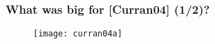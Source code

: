 \begin{frame}[plain]
	\frametitle{What was big for [Curran04] (1/2)?}
	\begin{block}{\begin{center}
    \end{center}} 
    \begin{center}
      \begin{figure}[H]
        \centering
        \texttt{[image: curran04a]}
      \end{figure}
    \end{center}
	\end{block} 
\end{frame}

